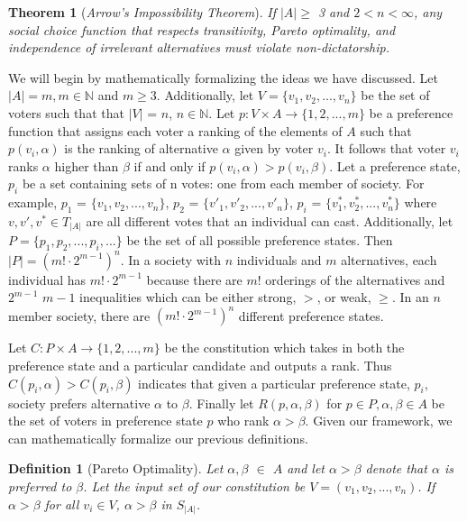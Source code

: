 \documentclass{amsart}
\newtheorem{theorem}{Theorem}
\newtheorem{definition}{Definition}
\theoremstyle{plain}
\begin{document}
\begin{theorem}[\emph{Arrow's Impossibility Theorem}]
    If $|A| \ge$ 3 and $2 < n < \infty$, any social choice function that respects transitivity, Pareto optimality, and independence of irrelevant alternatives must violate non-dictatorship.
\end{theorem}

    We will begin by mathematically formalizing the ideas we have discussed. Let $|A| = m, m \in \mathbb{N}$ and $m \ge 3$. Additionally, let $V = \{v_1, v_2, ... , v_n\}$ be the set of voters such that that $|V|$ = $n$, $n \in \mathbb{N}$. Let $p: V \times A \rightarrow \{1, 2, ... , m\}$ be a preference function that assigns each voter a ranking of the elements of $A$ such that $p(v_i, \alpha)$ is the ranking of alternative $\alpha$ given by voter $v_i$. It follows that voter $v_i$ ranks $\alpha$ higher than $\beta$ if and only if $p(v_i, \alpha) > p(v_i, \beta)$. Let a preference state, $p_i$ be a set containing sets of n votes: one from each member of society. For example, $p_1$ = $\{v_{1}, v_{2}, ... , v_{n}\}$, $p_2$ = $\{v'_{1}, v'_{2}, ... , v'_{n}\}$, $p_i$ = $\{v^*_{1}, v^*_{2}, ... , v^*_{n}\}$ where $v, v', v^* \in T_{|A|}$  are all different votes that an individual can cast. Additionally, let $P = \{p_1, p_2, ... , p_i, ...\}$ be the set of all possible preference states. Then $|P| = (m! \cdot 2^{m-1})^n$. In a society with $n$ individuals and $m$ alternatives, each individual has $m! \cdot 2^{m-1}$ because there are $m!$ orderings of the alternatives and $2^{m-1}$ $m-1$ inequalities which can be either strong, $>$, or weak, $\ge$. In an $n$ member society, there are $(m! \cdot 2^{m-1})^n$ different preference states. 

    Let $C: P \times A \rightarrow \{1, 2, ... , m\}$ be the constitution which takes in both the preference state and a particular candidate and outputs a rank. Thus $C(p_i, \alpha) > C(p_i, \beta)$ indicates that given a particular preference state, $p_i$, society prefers alternative $\alpha$ to $\beta$. Finally let $R(p, \alpha, \beta)$ for $p \in P, \alpha, \beta \in A$ be the set of voters in preference state $p$ who rank $\alpha > \beta$. Given our framework, we can mathematically formalize our previous definitions.

\begin{definition}[Pareto Optimality]
Let $\alpha, \beta$ $\in$ $A$ and let $\alpha > \beta$ denote that $\alpha$ is preferred to $\beta$. Let the input set of our constitution be $V = (v_1, v_2, ..., v_n)$. If $\alpha > \beta$ for all $v_i \in V$, $\alpha > \beta $ in $S_{|A|}$.
\end{definition}
\end{document}
